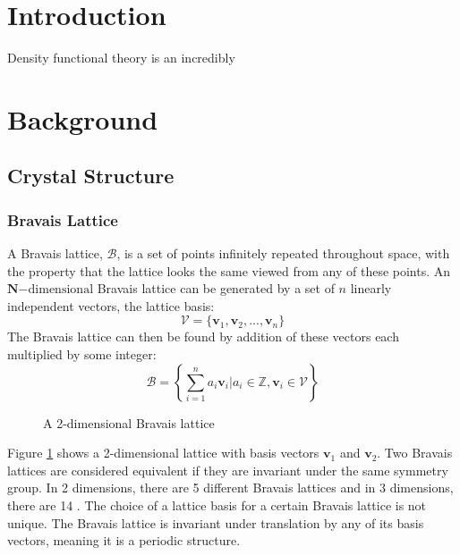 \documentclass[12pt]{article}
\begin{document}
\section{Introduction}
Density functional theory is an incredibly 

\section{Background}
\subsection{Crystal Structure}
\subsubsection{Bravais Lattice}
A Bravais lattice, $\mathcal{B}$, is a set of points infinitely repeated throughout space, with the property that the lattice looks the same viewed from any of these points. 
An $\mathbf{N}\mathrm{-dimensional}$ Bravais lattice can be generated by a set of $n$ linearly independent vectors, the lattice basis:
\begin{equation}\label{eq:lattice_basis}
	\mathcal{V} = \{\mathbf{v}_1, \mathbf{v}_2, ..., \mathbf{v}_n\}
\end{equation}
The Bravais lattice can then be found by addition of these vectors each multiplied by some integer:
\begin{equation}\label{eq:bravais_lattice}
	\mathcal{B} = \left \{\sum_{i=1}^n a_i\mathbf{v}_i \Big | a_i \in \mathbb{Z}, \mathbf{v}_i \in \mathcal{V}  \right \}
\end{equation}

\begin{figure}
\centering
{}%
\caption{A 2-dimensional Bravais lattice}
\label{fig:lattice_basis}
\end{figure}

Figure \ref{fig:lattice_basis} shows a 2-dimensional lattice with basis vectors $\mathbf{v}_1$ and $\mathbf{v}_2$. Two Bravais lattices are considered equivalent if they are invariant under the same symmetry group. In 2 dimensions, there are 5 different Bravais lattices and in 3 dimensions, there are 14 \cite{kittel2005introduction}. The choice of a lattice basis for a certain Bravais lattice is not unique.
The Bravais lattice is invariant under translation by any of its basis vectors, meaning it is a periodic structure. 
\end{document}
